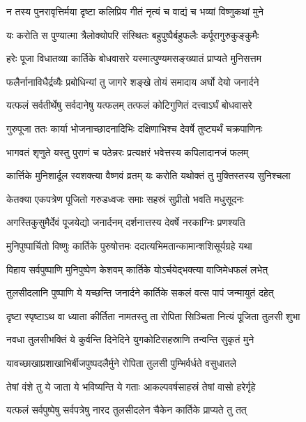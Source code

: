 \twolineshloka
{न तस्य पुनरावृत्तिर्मया दृष्टा कलिप्रिय}
{गीतं नृत्यं च वाद्यं च भव्यां विष्णुकथां मुने}%

\twolineshloka
{यः करोति स पुण्यात्मा त्रैलोक्योपरि संस्थितः}
{बहुपुष्पैर्बहुफलैः कर्पूरागुरुकुङ्कुमैः}%

\twolineshloka
{हरेः पूजा विधातव्या कार्तिके बोधवासरे}
{यस्मात्पुण्यमसङ्ख्यातं प्राप्यते मुनिसत्तम}%

\twolineshloka
{फलैर्नानाविधैर्द्रव्यैः प्रबोधिन्यां तु जागरे}
{शङ्खे तोयं समादाय अर्घो देयो जनार्दने}%

\twolineshloka
{यत्फलं सर्वतीर्थेषु सर्वदानेषु यत्फलम्}
{तत्फलं कोटिगुणितं दत्त्वाऽर्घं बोधवासरे}%

\twolineshloka
{गुरुपूजा ततः कार्या भोजनाच्छादनादिभिः}
{दक्षिणाभिश्च देवर्षे तुष्ट्यर्थं चक्रपाणिनः}%

\twolineshloka
{भागवतं शृणुते यस्तु पुराणं च पठेन्नरः}
{प्रत्यक्षरं भवेत्तस्य कपिलादानजं फलम्}%

\twolineshloka
{कार्त्तिके मुनिशार्दूल स्वशक्त्या वैष्णवं व्रतम्}
{यः करोति यथोक्तं तु मुक्तिस्तस्य सुनिश्चला}%

\twolineshloka
{केतक्या एकपत्रेण पूजितो गरुडध्वजः}
{समाः सहस्रं सुप्रीतो भवति मधुसूदनः}%

\twolineshloka
{अगस्तिकुसुमैर्देवं पूजयेद्यो जनार्दनम्}
{दर्शनात्तस्य देवर्षे नरकाग्निः प्रणश्यति}%

\twolineshloka
{मुनिपुष्पार्चितो विष्णुः कार्तिके पुरुषोत्तमः}
{ददात्यभिमतान्कामान्शशिसूर्यग्रहे यथा}%

\twolineshloka
{विहाय सर्वपुष्पाणि मुनिपुष्पेण केशवम्}
{कार्तिके योऽर्चयेद्भक्त्या वाजिमेधफलं लभेत्}%

\twolineshloka
{तुलसीदलानि पुष्पाणि ये यच्छन्ति जनार्दने}
{कार्तिके सकलं वत्स पापं जन्मायुतं दहेत्}%

\twolineshloka
{दृष्टा स्पृष्टाऽथ वा ध्याता कीर्तिता नामतस्तु ता}
{रोपिता सिञ्चिता नित्यं पूजिता तुलसी शुभा}%

\twolineshloka
{नवधा तुलसीभक्तिं ये कुर्वन्ति दिनेदिने}
{युगकोटिसहस्राणि तन्वन्ति सुकृतं मुने}%

\twolineshloka
{यावच्छाखाप्रशाखाभिर्बीजपुष्पदलैर्मुने}
{रोपिता तुलसी पुम्भिर्वर्धते वसुधातले}%

\twolineshloka
{तेषां वंशे तु ये जाता ये भविष्यन्ति ये गताः}
{आकल्पवर्षसाहस्रं तेषां वासो हरेर्गृहे}%

\twolineshloka
{यत्फलं सर्वपुष्पेषु सर्वपत्रेषु नारद}
{तुलसीदलेन चैकेन कार्तिके प्राप्यते तु तत्}%

